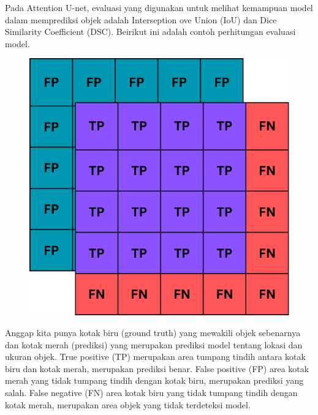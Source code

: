  \noindent Pada Attention U-net, evaluasi yang digunakan untuk melihat kemampuan model dalam memprediksi objek adalah Interseption ove Union (IoU) dan Dice Similarity Coefficient (DSC). Beirikut ini adalah contoh perhitungan evaluasi model.
 
 \begin{figure}[H]
 	\centering
 	\includegraphics[scale=.3]{gambar/lampiran/prediksi.png}
 \end{figure}    
 
 \noindent Anggap kita punya kotak biru (ground truth) yang mewakili objek sebenarnya dan kotak merah (prediksi) yang merupakan prediksi model tentang lokasi dan ukuran objek. True positive (TP) merupakan area tumpang tindih antara kotak biru dan kotak merah, merupakan prediksi benar. False positive (FP) area kotak merah yang tidak tumpang tindih dengan kotak biru, merupakan prediksi yang salah. False negative (FN) area kotak biru yang tidak tumpang tindih dengan kotak merah, merupakan area objek yang tidak terdeteksi model.    
 
